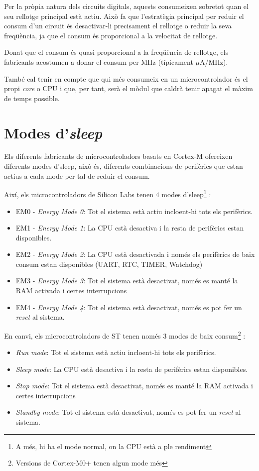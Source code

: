Per la pròpia natura dels circuits digitals, aquests consumeixen sobretot quan el seu rellotge principal està actiu. Això fa que l'estratègia principal per reduir el consum d'un circuit és desactivar-li precisament el rellotge o reduir la seva freqüència, ja que el consum és proporcional a la velocitat de rellotge.
\begin{remark}
 Donat que el consum és quasi proporcional a la freqüència de rellotge, els fabricants acostumen a donar el consum per MHz (típicament $\mu$A/MHz).
\end{remark}

També cal tenir en compte que qui més consumeix en un microcontrolador és el propi {\em core} o CPU i que, per tant, serà el mòdul que caldrà tenir apagat el màxim de temps possible.

\section{Modes d'{\em sleep}}
\label{sec:sleepmodes}
Els diferents fabricants de microcontroladors basats en Cortex-M ofereixen diferents modes d'sleep, això és, diferents combinacions de perifèrics que estan actius a cada mode per tal de reduir el consum.

Així, els microcontroladors de Silicon Labs tenen 4 modes d'sleep\footnote{A més, hi ha el mode normal, on la CPU està a ple rendiment} \cite[6]{EFM32GRM}:
\begin{itemize}
 \item EM0 - {\em Energy Mode 0}: Tot el sistema està actiu incloent-hi tots els perifèrics.
 \item EM1 - {\em Energy Mode 1}: La CPU està desactiva i la resta de perifèrics estan disponibles.
 \item EM2 - {\em Energy Mode 2}: La CPU està desactivada i només els perifèrics de baix consum estan disponibles (UART, RTC, TIMER, Watchdog)
 \item EM3 - {\em Energy Mode 3}: Tot el sistema està desactivat, només es manté la RAM activada i certes interrupcions
 \item EM4 - {\em Energy Mode 4}: Tot el sistema està desactivat, només es pot fer un {\em reset} al sistema.
\end{itemize}

En canvi, els microcontroladors de ST tenen només 3 modes de baix consum\footnote{Versions de Cortex-M0+ tenen algun mode més} \cite[126]{STM32F4RM}:
\begin{itemize}
 \item {\em Run mode}: Tot el sistema està actiu incloent-hi tots els perifèrics.
 \item {\em Sleep mode}: La CPU està desactiva i la resta de perifèrics estan disponibles.
 \item {\em Stop mode}: Tot el sistema està desactivat, només es manté la RAM activada i certes interrupcions
 \item {\em Standby mode}: Tot el sistema està desactivat, només es pot fer un {\em reset} al sistema.
\end{itemize}

